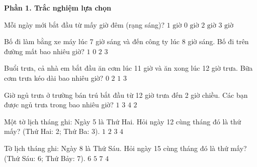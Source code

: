 \textbf{Phần 1. Trắc nghiệm lựa chọn}

\begin{ex} %
Mỗi ngày mới bắt đầu từ mấy giờ đêm (rạng sáng)?
\choice
{$1\text{ giờ}$}
{\True $0\text{ giờ}$}
{$2\text{ giờ}$}
{$3\text{ giờ}$}
\end{ex}

\begin{ex} %
Bố đi làm bằng xe máy lúc 7 giờ sáng và đến công ty lúc 8 giờ sáng. Bố đi trên đường mất bao nhiêu giờ?
\choice
{\True $1$}
{$0$}
{$2$}
{$3$}
\end{ex}

\begin{ex} %
Buổi trưa, cả nhà em bắt đầu ăn cơm lúc 11 giờ và ăn xong lúc 12 giờ trưa. Bữa cơm trưa kéo dài bao nhiêu giờ?
\choice
{$0$}
{$2$}
{\True $1$}
{$3$}
\end{ex}

\begin{ex} %
Giờ ngủ trưa ở trường bán trú bắt đầu từ 12 giờ trưa đến 2 giờ chiều. Các bạn được ngủ trưa trong bao nhiêu giờ?
\choice
{$1$}
{$3$}
{$4$}
{\True $2$}
\end{ex}

\begin{ex} %
Một tờ lịch tháng ghi: Ngày 5 là Thứ Hai. Hỏi ngày 12 cùng tháng đó là thứ mấy? (Thứ Hai: 2; Thứ Ba: 3).
\choice
{$1$}
{\True $2$}
{$3$}
{$4$}
\end{ex}

\begin{ex} %
Tờ lịch tháng ghi: Ngày 8 là Thứ Sáu. Hỏi ngày 15 cùng tháng đó là thứ mấy? (Thứ Sáu: 6; Thứ Bảy: 7).
\choice
{\True $6$}
{$5$}
{$7$}
{$4$}
\end{ex}

